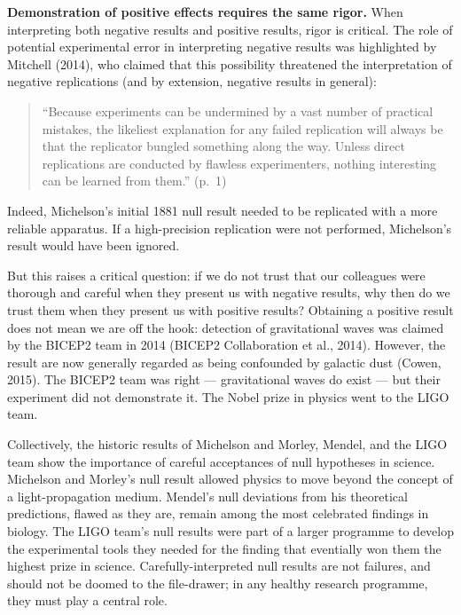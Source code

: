 \documentclass[english,floatsintext,man]{apa6}
\theoremstyle{definition}
\theoremstyle{definition}
\theoremstyle{definition}
\theoremstyle{remark}
\begin{document}
\textbf{Demonstration of positive effects requires the same rigor.} When
interpreting both negative results and positive results, rigor is
critical. The role of potential experimental error in interpreting
negative results was highlighted by Mitchell (2014), who claimed that
this possibility threatened the interpretation of negative replications
(and by extension, negative results in general):

\begin{quote}
\enquote{Because experiments can be undermined by a vast number of
practical mistakes, the likeliest explanation for any failed replication
will always be that the replicator bungled something along the way.
Unless direct replications are conducted by flawless experimenters,
nothing interesting can be learned from them.} (p.~1)
\end{quote}

Indeed, Michelson's initial 1881 null result needed to be replicated
with a more reliable apparatus. If a high-precision replication were not
performed, Michelson's result would have been ignored.

But this raises a critical question: if we do not trust that our
colleagues were thorough and careful when they present us with negative
results, why then do we trust them when they present us with positive
results? Obtaining a positive result does not mean we are off the hook:
detection of gravitational waves was claimed by the BICEP2 team in 2014
(BICEP2 Collaboration et al., 2014). However, the result are now
generally regarded as being confounded by galactic dust (Cowen, 2015).
The BICEP2 team was right --- gravitational waves do exist --- but their
experiment did not demonstrate it. The Nobel prize in physics went to
the LIGO team.

Collectively, the historic results of Michelson and Morley, Mendel, and
the LIGO team show the importance of careful acceptances of null
hypotheses in science. Michelson and Morley's null result allowed
physics to move beyond the concept of a light-propagation medium.
Mendel's null deviations from his theoretical predictions, flawed as
they are, remain among the most celebrated findings in biology. The LIGO
team's null results were part of a larger programme to develop the
experimental tools they needed for the finding that eventially won them
the highest prize in science. Carefully-interpreted null results are not
failures, and should not be doomed to the file-drawer; in any healthy
research programme, they must play a central role.
\end{document}
